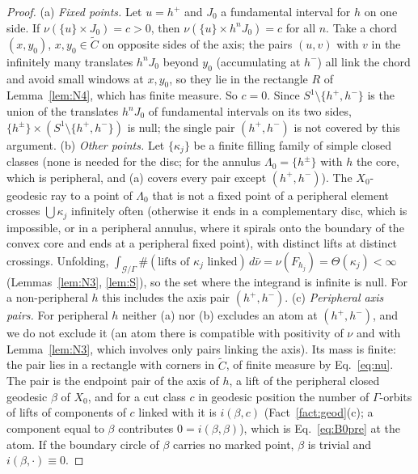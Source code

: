 \documentclass[aps,prd,onecolumn,superscriptaddress,nofootinbib,amsmath,amssymb,11pt]{revtex4-2}
\theoremstyle{definition}
\newcommand{\G}{\mathcal{G}}
\begin{document}
\begin{proof}
(a) \emph{Fixed points.} Let $u=h^+$ and $J_0$ a fundamental interval for $h$ on one side. If $\nu(\{u\}\times J_0)=c>0$, then
$\nu(\{u\}\times h^nJ_0)=c$ for all $n$. Take a chord $(x,y_0)$, $x,y_0\in\tilde C$ on opposite sides of the axis; the pairs $(u,v)$
with $v$ in the infinitely many translates $h^nJ_0$ beyond $y_0$ (accumulating at $h^-$) all link the chord and avoid small
windows at $x,y_0$, so they lie in the rectangle $R$ of Lemma~\ref{lem:N4}, which has finite measure. So $c=0$. Since
$S^1\setminus\{h^+,h^-\}$ is the union of the translates $h^nJ_0$ of fundamental intervals on its two sides, $\{h^\pm\}\times(S^1\setminus
\{h^+,h^-\})$ is null; the single pair $(h^+,h^-)$ is not covered by this argument.
(b) \emph{Other points.} Let $\{\kappa_j\}$ be a finite filling family of simple closed classes (none is needed for the disc; for
the annulus $\Lambda_0=\{h^\pm\}$ with $h$ the core, which is peripheral, and (a) covers every pair except $(h^+,h^-)$). The $X_0$-geodesic ray to a point of $\Lambda_0$ that is not a fixed point of a
peripheral element crosses $\bigcup\kappa_j$ infinitely often (otherwise it ends in a complementary disc, which is impossible, or in a
peripheral annulus, where it spirals onto the boundary of the convex core and ends at a peripheral fixed point), with distinct
lifts at distinct crossings. Unfolding, $\int_{\G/\Gamma}\#(\text{lifts of }\kappa_j\text{ linked})\,d\bar\nu=\nu(F_{h_j})=\Theta(\kappa_j)<\infty$
(Lemmas~\ref{lem:N3}, \ref{lem:S}), so the set where the integrand is infinite is null. For a non-peripheral $h$ this includes the
axis pair $(h^+,h^-)$. (c) \emph{Peripheral axis pairs.} For peripheral $h$ neither (a) nor (b) excludes an atom at $(h^+,h^-)$,
and we do not exclude it (an atom there is compatible with positivity of $\nu$ and with Lemma~\ref{lem:N3}, which involves only
pairs linking the axis). Its mass is finite: the pair lies
in a rectangle with corners in $\tilde C$, of finite measure by Eq.~\eqref{eq:nu}. The pair is the endpoint pair of the axis of $h$, a lift of the
peripheral closed geodesic $\beta$ of $X_0$, and for a cut class $c$ in geodesic position the number of $\Gamma$-orbits of lifts of components of $c$ linked
with it is $i(\beta,c)$ (Fact~\ref{fact:geod}(c); a component equal to $\beta$ contributes $0=i(\beta,\beta)$), which is
Eq.~\eqref{eq:B0pre} at the atom. If the boundary circle of $\beta$ carries no marked point, $\beta$ is trivial and $i(\beta,\cdot)\equiv0$.
\end{proof}
\end{document}
